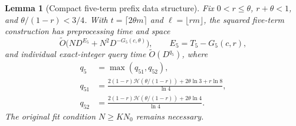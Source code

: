\documentclass[11pt]{article}
\newtheorem{lemma}[theorem]{Lemma}
\newcommand{\softO}{\widetilde O}
\newcommand{\HH}{\mathcal H}
\begin{document}
\begin{lemma}[Compact five-term prefix data structure]
\label{lem:five-prefix}
Fix $0<r\le\theta$, $r+\theta<1$, and
$\theta/(1-r)<3/4$. With $t=\lceil2\theta m\rceil$ and
$\ell=\lfloor rm\rfloor$, the squared five-term construction has
preprocessing time and space
\[
\softO\bigl(ND^{E_5}+N^2D^{-G_5(c,\theta)}\bigr),\qquad
E_5=T_5-G_5(c,r),
\]
and individual exact-integer query time $\softO(D^{q_5})$, where
\[
\begin{split}
q_5&=\max(q_{51},q_{52}),\\
q_{51}&=\frac{2(1-r)\HH(\theta/(1-r))+2\theta\ln3+r\ln8}{\ln4},\\
q_{52}&=\frac{2(1-r)\HH(\theta/(1-r))+2\theta\ln4}{\ln4}.
\end{split}
\]
The original fit condition $N\ge KN_0$ remains necessary.
\end{lemma}
\end{document}
